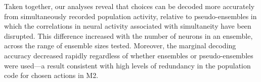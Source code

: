 Taken together, our analyses reveal that choices can be decoded more accurately from simultaneously recorded population activity, relative to pseudo-ensembles in which the correlations in neural activity associated with simultaneity have been disrupted. This difference increased with the number of neurons in an ensemble, across the range of ensemble sizes tested. Moreover, the marginal decoding accuracy decreased rapidly regardless of whether ensembles or pseudo-ensembles were used—a result consistent with high levels of redundancy in the population code for chosen actions in M2.